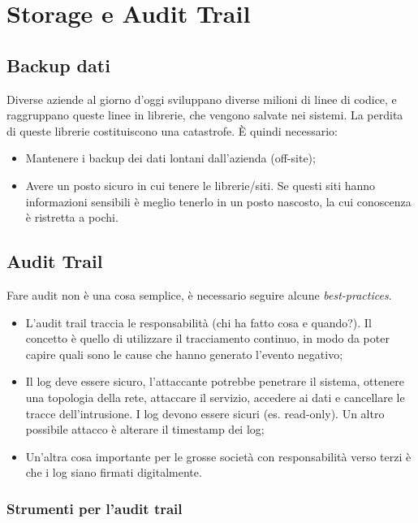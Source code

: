 \section{Storage e Audit Trail}
\label{sat}

\subsection{Backup dati}

Diverse aziende al giorno d'oggi sviluppano diverse milioni di linee di codice,
e raggruppano queste linee in librerie, che vengono salvate nei sistemi. La
perdita di queste librerie costituiscono una catastrofe. È quindi necessario:
\begin{itemize}
 \item Mantenere i backup dei dati lontani dall'azienda (off-site);
 \item Avere un posto sicuro in cui tenere le librerie/siti. Se questi siti
 hanno informazioni sensibili è meglio tenerlo in un posto nascosto, la cui
 conoscenza è ristretta a pochi.
\end{itemize}

\subsection{Audit Trail}

Fare audit non è una cosa semplice, è necessario seguire alcune
\textit{best-practices}.

\begin{itemize}
 \item L'audit trail traccia le responsabilità (chi ha fatto cosa e quando?).
 Il concetto è quello di utilizzare il tracciamento continuo, in modo da poter
 capire quali sono le cause che hanno generato l'evento negativo;
 \item Il log deve essere sicuro, l'attaccante potrebbe penetrare il sistema,
 ottenere una topologia della rete, attaccare il servizio, accedere ai dati e
 cancellare le tracce dell'intrusione. I log devono essere sicuri (es. 
 read-only). Un altro possibile attacco è alterare il timestamp dei log;
 \item Un'altra cosa importante per le grosse società con responsabilità verso
 terzi è che i log siano firmati digitalmente.

\end{itemize}

\subsubsection{Strumenti per l'audit trail}

